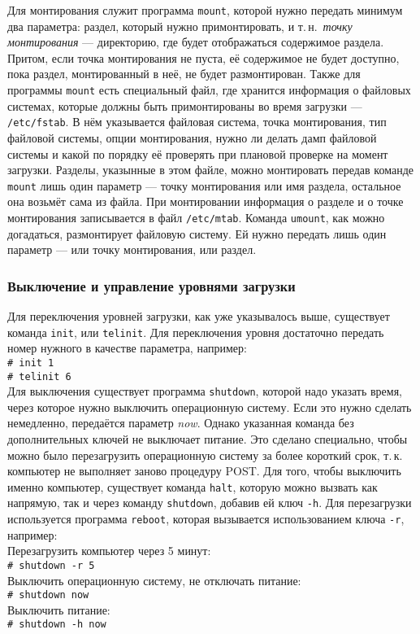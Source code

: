 Для монтирования служит программа \texttt{mount}, которой нужно передать минимум два параметра: раздел, который нужно примонтировать, и т.\,н.~\emph{точку монтирования} --- директорию, где будет отображаться содержимое раздела. Притом, если точка монтирования не пуста, её содержимое не будет доступно, пока раздел, монтированный в неё, не будет размонтирован.
Также для программы \texttt{mount} есть специальный файл, где хранится информация о файловых системах, которые должны быть примонтированы во время загрузки --- \texttt{/etc/fstab}\label{fstab}. В нём указывается файловая система, точка монтирования, тип файловой системы, опции монтирования, нужно ли делать дамп файловой системы и какой по порядку её проверять при плановой проверке на момент загрузки.
Разделы, указынные в этом файле, можно монтировать передав команде \texttt{mount} лишь один параметр --- точку монтирования или имя раздела, остальное она возьмёт сама из файла.
При монтировании информация о разделе и о точке монтирования записывается в файл \texttt{/etc/mtab}.
Команда \texttt{umount}, как можно догадаться, размонтирует файловую систему. Ей нужно передать лишь один параметр --- или точку монтирования, или раздел.

\subsubsection{Выключение и управление уровнями загрузки}\label{base:os:structure:sysutils:shutdown}
Для переключения уровней загрузки, как уже указывалось выше, существует команда \texttt{init}, или \texttt{telinit}. Для переключения уровня достаточно передать номер нужного в качестве параметра, например:\\
\texttt{\# init 1}\\
\texttt{\# telinit 6}\\
Для выключения существует программа \texttt{shutdown}, которой надо указать время, через которое нужно выключить операционную систему. Если это нужно сделать немедленно, передаётся параметр \emph{now}. Однако указанная команда без дополнительных ключей не выключает питание. Это сделано специально, чтобы можно было перезагрузить операционную систему за более короткий срок, т.\,к. компьютер не выполняет заново процедуру POST.
Для того, чтобы выключить именно компьютер, существует команда \texttt{halt}, которую можно вызвать как напрямую, так и через команду \texttt{shutdown}, добавив ей ключ \texttt{-h}. Для перезагрузки используется программа \texttt{reboot}, которая вызывается использованием ключа \texttt{-r}, например:\\
Перезагрузить компьютер через 5 минут:\\
\texttt{\# shutdown -r 5}\\
Выключить операционную систему, не отключать питание:\\
\texttt{\# shutdown now}\\
Выключить питание:\\
\texttt{\# shutdown -h now}
 

